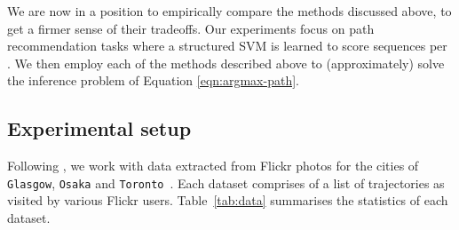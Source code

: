 
We are now in a position to empirically compare the methods discussed above,
to get a firmer sense of their tradeoffs.
Our experiments focus on path recommendation tasks where a structured SVM is learned to score sequences per \citet{Chen:2017}.
We then employ each of the methods described above to (approximately) solve the inference problem of Equation \ref{eqn:argmax-path}.

%
\subsection{Experimental setup}

Following \citet{cikm16paper,Chen:2017},
we work with
data
extracted from Flickr photos for the cities of {\tt Glasgow}, {\tt Osaka} and
{\tt Toronto}~\cite{ijcai15,cikm16paper}.
Each dataset comprises of a
list of trajectories as visited by various Flickr users. %
Table~\ref{tab:data} summarises the statistics of each dataset.


